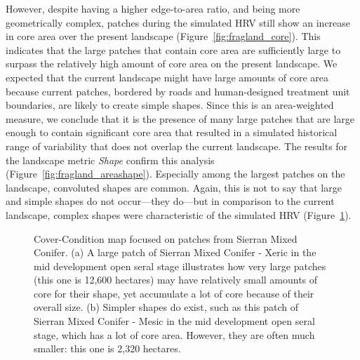 However, despite having a higher edge-to-area ratio, and being more geometrically complex, patches during the simulated HRV still show an increase in core area over the present landscape (Figure~\ref{fig:fragland_core}). This indicates that the large patches that contain core area are sufficiently large to surpass the relatively high amount of core area on the present landscape. We expected that the current landscape might have large amounts of core area because current patches, bordered by roads and human-designed treatment unit boundaries, are likely to create simple shapes. Since this is an area-weighted measure, we conclude that it is the presence of many large patches that are large enough to contain significant core area that resulted in a simulated historical range of variability that does not overlap the current landscape. The results for the landscape metric \emph{Shape} confirm this analysis (Figure~\ref{fig:fragland_areashape}). Especially among the largest patches on the landscape, convoluted shapes are common. Again, this is not to say that large and simple shapes do not occur---they do---but in comparison to the current landscape, complex shapes were characteristic of the simulated HRV (Figure~\ref{fig:patchmaps4}).

\begin{figure}[!htbp]
  \centering
  \caption{Cover-Condition map focused on patches from Sierran Mixed Conifer. (a) A large patch of Sierran Mixed Conifer - Xeric in the mid development open seral stage illustrates how very large patches (this one is 12,600 hectares) may have relatively small amounts of core for their shape, yet accumulate a lot of core because of their overall size. (b) Simpler shapes do exist, such as this patch of Sierran Mixed Conifer - Mesic in the mid development open seral stage, which has a lot of core area. However, they are often much smaller: this one is 2,320 hectares.}
  \label{fig:patchmaps4}
\end{figure}



